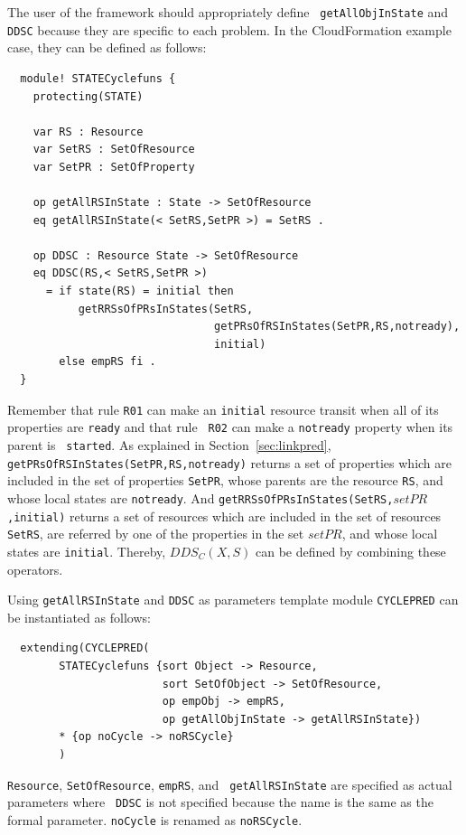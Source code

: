 \documentclass[12pt]{report}
\newcommand{\stt}[1]{{\small{\tt {#1}}}}
\begin{document}
The user of the framework should appropriately define {\tt
  getAllObjInState} and {\tt DDSC} because they are specific to each
problem. In the CloudFormation example case, they can be defined as
follows:
\small
\begin{verbatim}
  module! STATECyclefuns {
    protecting(STATE)
  
    var RS : Resource
    var SetRS : SetOfResource
    var SetPR : SetOfProperty
  
    op getAllRSInState : State -> SetOfResource
    eq getAllRSInState(< SetRS,SetPR >) = SetRS .
  
    op DDSC : Resource State -> SetOfResource
    eq DDSC(RS,< SetRS,SetPR >)
      = if state(RS) = initial then
           getRRSsOfPRsInStates(SetRS,
                                getPRsOfRSInStates(SetPR,RS,notready),
                                initial)
        else empRS fi .
  }
\end{verbatim}
\normalsize
Remember that rule {\tt R01} can make an {\tt initial} resource
transit when all of its properties are {\tt ready} and that rule {\tt
  R02} can make a {\tt notready} property when its parent is {\tt
  started}. As explained in Section~\ref{sec:linkpred},
\stt{getPRsOfRSInStates(SetPR,RS,notready)} returns a set of
properties which are included in the set of properties {\tt SetPR},
whose parents are the resource {\tt RS}, and whose local states are
{\tt notready}. And \stt{getRRSsOfPRsInStates(SetRS,$setPR$,initial)}
returns a set of resources which are included in the set of resources
{\tt SetRS}, are referred by one of the properties in the set $setPR$,
and whose local states are {\tt initial}. Thereby, $DDS_C(X,S)$ can be
defined by combining these operators.

Using {\tt getAllRSInState} and {\tt DDSC} as parameters template
module {\tt CYCLEPRED} can be instantiated as follows:
\small
\begin{verbatim}
  extending(CYCLEPRED(
        STATECyclefuns {sort Object -> Resource,
                        sort SetOfObject -> SetOfResource,
                        op empObj -> empRS,
                        op getAllObjInState -> getAllRSInState})
        * {op noCycle -> noRSCycle}
        )
\end{verbatim}
\normalsize
 {\tt Resource}, {\tt SetOfResource}, {\tt empRS}, and {\tt
   getAllRSInState} are specified as actual parameters where {\tt
   DDSC} is not specified because the name is the same as the formal
 parameter.  {\tt noCycle} is renamed as {\tt noRSCycle}.
\end{document}
